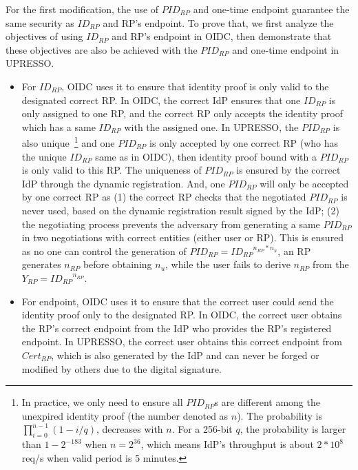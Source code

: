 For the first modification, the use of $PID_{RP}$ and one-time endpoint guarantee the same security as $ID_{RP}$ and RP's endpoint. To prove that, we first analyze the objectives of using $ID_{RP}$ and RP's endpoint in OIDC, then demonstrate that these objectives are also be achieved with the $PID_{RP}$ and one-time endpoint in UPRESSO.
\begin{itemize}
  \item For $ID_{RP}$, OIDC uses it to ensure that identity proof is only valid to the designated correct RP. In OIDC, the correct IdP ensures that one $ID_{RP}$ is only assigned to one RP, and the correct RP only accepts the identity proof which has a same $ID_{RP}$ with the assigned one.
      In UPRESSO, the $PID_{RP}$ is also unique~\footnote{In practice, we only need to ensure all $PID_{RP}$s are different among the unexpired identity proof (the number denoted as $n$). The  probability is $\prod_{i=0}^{n-1}(1-i/q)$, decreases with $n$. For  a 256-bit $q$, the probability is larger than $1-2^{-183}$ when $n=2^{36}$, which means IdP's throughput is about $2*10^8$ req/s when valid period is 5 minutes.}
       and one $PID_{RP}$ is  only accepted by one correct RP (who has the unique $ID_{RP}$ same as in OIDC), then identity proof bound with a $PID_{RP}$ is only valid to this RP.
      The uniqueness of $PID_{RP}$ is ensured by the correct IdP through the dynamic registration.
      And, one $PID_{RP}$ will only be accepted by one correct RP as
      (1) the correct RP checks that the negotiated $PID_{RP}$ is never used,  based on the dynamic registration result signed by the IdP;
      (2) the negotiating process prevents the adversary from generating a same $PID_{RP}$  in two negotiations with correct entities (either user or RP).
      This is ensured as no one can control the generation of $PID_{RP}={ID_{RP}}^{n_{RP}*n_{u}}$,  an RP  generates $n_{RP}$ before obtaining $n_{u}$, while the user fails to derive $n_{RP}$ from the $Y_{RP}={ID_{RP}}^{n_{RP}}$.


   \item For endpoint, OIDC uses it to ensure that the correct user could send the identity proof only to the designated RP. In OIDC, the correct user obtains the RP's correct endpoint from the IdP who provides the RP's registered endpoint. In UPRESSO, the correct user obtains this correct endpoint from $Cert_{RP}$, which is also generated by the IdP and can never be forged or modified by others due to the digital signature.
\end{itemize}

